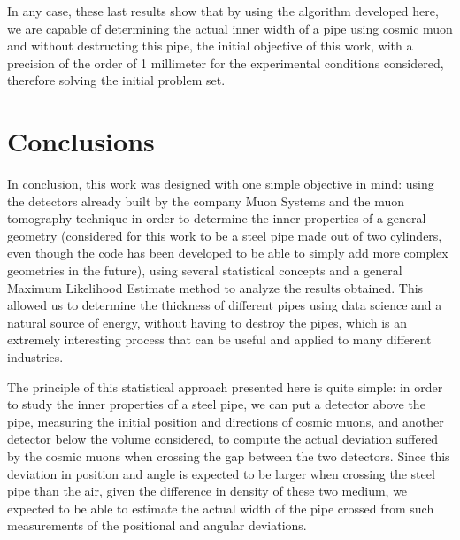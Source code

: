 \documentclass[a4paper, 11pt]{report}
\begin{document}
In any case, these last results show that by using the algorithm developed here, we are capable of determining the actual inner width of a pipe using cosmic muon and without destructing this pipe, the initial objective of this work, with a precision of the order of 1 millimeter for the experimental conditions considered, therefore solving the initial problem set.























\chapter{Conclusions}

In conclusion, this work was designed with one simple objective in mind: using the detectors already built by the company Muon Systems and the muon tomography technique in order to determine the inner properties of a general geometry (considered for this work to be a steel pipe made out of two cylinders, even though the code has been developed to be able to simply add more complex geometries in the future), using several statistical concepts and a general Maximum Likelihood Estimate method to analyze the results obtained. This allowed us to determine the thickness of different pipes using data science and a natural source of energy, without having to destroy the pipes, which is an extremely interesting process that can be useful and applied to many different industries.

The principle of this statistical approach presented here is quite simple: in order to study the inner properties of a steel pipe, we can put a detector above the pipe, measuring the initial position and directions of cosmic muons, and another detector below the volume considered, to compute the actual deviation suffered by the cosmic muons when crossing the gap between the two detectors. Since this deviation in position and angle is expected to be larger when crossing the steel pipe than the air, given the difference in density of these two medium, we expected to be able to estimate the actual width of the pipe crossed from such measurements of the positional and angular deviations. 
\end{document}
